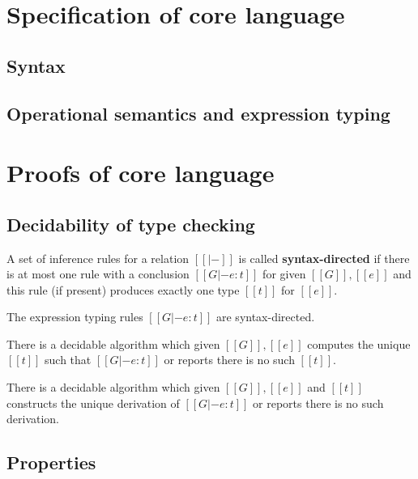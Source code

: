 \section{Specification of core language}

\subsection{Syntax}
\gram{\otte\ottinterrule
        \otts\ottinterrule
        \ottG\ottinterrule
        \ottv}

\subsection{Operational semantics and expression typing}
\ottdefnstep{}
\ottusedrule{\ottdruleSXXMu{}}
\ottdefnexpr{}
\ottusedrule{\ottdruleTXXMu{}}

\section{Proofs of core language}
\subsection{Decidability of type checking}
\begin{dfn}
A set of inference rules for a relation $[[|-]]$ is called \textbf{syntax-directed} if there is at most one rule with a conclusion $[[G |- e:t]]$ for given $[[G]],[[e]]$ and this rule (if present) produces exactly one type $[[t]]$ for $[[e]]$.
\end{dfn}

\begin{lem}
The expression typing rules $[[G |- e:t]]$ are syntax-directed.
\end{lem}

\begin{lem}
There is a decidable algorithm which given $[[G]], [[e]]$ computes the unique $[[t]]$ such that $[[G |- e:t]]$ or reports there is no such $[[t]]$.
\end{lem}

\begin{lem}
There is a decidable algorithm which given $[[G]], [[e]]$ and $[[t]]$ constructs the unique derivation of $[[G |- e:t]]$ or reports there is no such derivation.
\end{lem}

\subsection{Properties}
\newcommand{\FV}{\mathrm{FV}}
\newcommand{\dom}{\mathrm{dom}}

